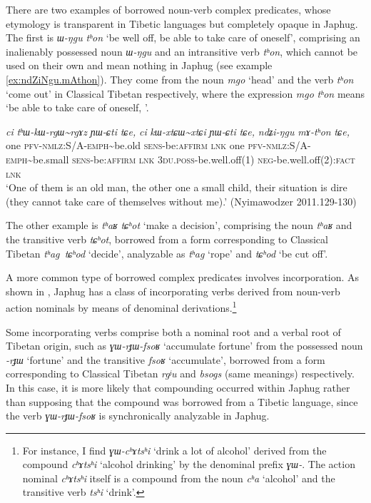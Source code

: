 \documentclass[oneside,a4paper,11pt]{article}
\newcommand{\ipa}[1]{{\phon\textit{\mbox{#1}}}} %
\begin{document}
There are two examples of borrowed noun-verb complex predicates, whose etymology is transparent in Tibetic languages but completely opaque in Japhug. The first is \ipa{ɯ-ŋgu} \ipa{tʰon} `be well off, be able to take care of oneself', comprising an inalienably possessed noun \ipa{ɯ-ŋgu} and an intransitive verb \ipa{tʰon}, which cannot be used on their own and mean nothing in Japhug (see example \ref{ex:ndZiNgu.mAthon}). They come from the noun \ipa{mgo} `head' and the verb \ipa{tʰon} `come out' in Classical Tibetan respectively, where the expression \ipa{mgo} \ipa{tʰon} means `be able to take care of oneself, '.


\begin{exe}
\ex \label{ex:ndZiNgu.mAthon}
\gll
\ipa{ci}  	\ipa{tʰɯ-kɯ-rgɯ\textasciitilde{}rgɤz}  	\ipa{ɲɯ-ɕti}  	\ipa{tɕe,}  	\ipa{ci}  	\ipa{kɯ-xtɕɯ\textasciitilde{}xtɕi}  	\ipa{ɲɯ-ɕti}  	\ipa{tɕe,}  	\ipa{ndʑi-ŋgu}  	\ipa{mɤ-tʰon}  	\ipa{tɕe,}  	  \\
one \textsc{pfv-nmlz}:S/A-\textsc{emph}\textasciitilde{}be.old \textsc{sens}-be:\textsc{affirm} \textsc{lnk} one \textsc{pfv-nmlz}:S/A-\textsc{emph}\textasciitilde{}be.small \textsc{sens}-be:\textsc{affirm} \textsc{lnk} \textsc{3du.poss}-be.well.off(1) \textsc{neg}-be.well.off(2):\textsc{fact} \textsc{lnk} \\
\glt `One of them is an old man, the other one a small child, their situation is dire (they cannot take care of themselves without me).' (Nyimawodzer 2011.129-130)
\end{exe}  

The other example is \ipa{tʰaʁ} \ipa{tɕʰot} `make a decision', comprising the noun \ipa{tʰaʁ} and the transitive verb \ipa{tɕʰot}, borrowed from a form corresponding to Classical Tibetan  \ipa{tʰag tɕʰod} `decide', analyzable as \ipa{tʰag} `rope' and \ipa{tɕʰod} `be cut off'.

A more common type of borrowed complex predicates involves incorporation. As shown in \citet{jacques12incorp}, Japhug has a class of incorporating verbs derived from noun-verb action nominals by means of denominal derivations.\footnote{For instance, I find \ipa{ɣɯ-cʰɤtsʰi} `drink a lot of alcohol' derived from the compound \ipa{cʰɤtsʰi} `alcohol drinking' by the denominal prefix \ipa{ɣɯ-}. The action nominal \ipa{cʰɤtsʰi} itself is a compound from the noun \ipa{cʰa} `alcohol' and the transitive verb \ipa{tsʰi} `drink'.}

Some incorporating verbs comprise both a nominal root and a verbal root of Tibetan origin, such as \ipa{ɣɯ-rɟɯ-fsoʁ} `accumulate fortune' from the possessed noun \ipa{-rɟɯ} `fortune' and the transitive \ipa{fsoʁ} `accumulate', borrowed from a form corresponding to Classical Tibetan \ipa{rgʲu} and \ipa{bsogs} (same meanings) respectively. In this case, it is more likely that compounding occurred within Japhug rather than supposing that the compound was borrowed from a Tibetic language, since the verb \ipa{ɣɯ-rɟɯ-fsoʁ} is synchronically analyzable in Japhug.
\end{document}
